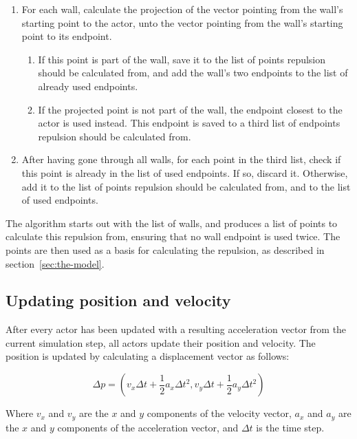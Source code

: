 \begin{enumerate}
    \item For each wall, calculate the projection of the vector pointing from 
        the wall's starting point to the actor, unto the vector pointing from 
        the wall's starting point to its endpoint.
        \begin{enumerate}
            \item If this point is part of the wall, save it to the list of points 
                repulsion should be calculated from, and add the wall's two endpoints 
                to the list of already used endpoints.

            \item If the projected point is not part of the wall, the endpoint closest 
                to the actor is used instead. This endpoint is saved to a 
                third list of endpoints repulsion should be calculated from.
        \end{enumerate}

    \item After having gone through all walls, for each point in the third 
        list, check if this point is already in the list of used endpoints. If 
        so, discard it. Otherwise, add it to the list of points repulsion 
        should be calculated from, and to the list of used endpoints.
\end{enumerate}

The algorithm starts out with the list of walls, and produces a list of points 
to calculate this repulsion from, ensuring that no wall endpoint is used 
twice. The points are then used as a basis for calculating the repulsion, as 
described in section~\ref{sec:the-model}.

\subsection{Updating position and velocity}
After every actor has been updated with a resulting acceleration vector from 
the current simulation step, all actors update their position and velocity.  
The position is updated by calculating a displacement vector as follows:

\begin{equation}
    \Delta p = (v_x \Delta t + \frac{1}{2}a_x \Delta t^2, v_y \Delta t + 
    \frac{1}{2}a_y \Delta t^2)
\end{equation}

Where $v_x$ and $v_y$ are the $x$ and $y$ components of the velocity vector, 
$a_x$ and $a_y$ are the $x$ and $y$ components of the acceleration vector, and 
$\Delta t$ is the time step.

